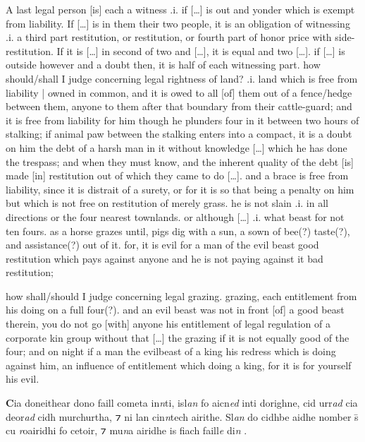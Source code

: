 \documentclass[11pt]{article}
\begin{document}
\begin{pages}
  \begin{Rightside}
    \beginnumbering
   \pstart
   A last legal person [is] each a witness .i. if [\ldots] is out and yonder which is exempt from liability.  If [\ldots] is in them their two people, it is an obligation of witnessing .i. a third part restitution, or restitution, or fourth part of honor price with side-restitution.  If it is [\ldots{}] in second of two and [\ldots{}], it is equal and two [\ldots{}]. if [\ldots{}] is outside however and a doubt then, it is half of each witnessing part.  how should/shall I judge concerning legal rightness of land? .i. land which is free from liability | owned in common, and it is owed to all [of] them out of a fence/hedge between them, anyone to them after that boundary from their cattle-guard; and it is free from liability for him though he plunders four in it between two hours of stalking; if animal paw between the stalking enters into a compact, it is a doubt on him the debt of a harsh man in it without knowledge [\ldots] which he has done the trespass; and when they must know, and the inherent quality of the debt [is] made [in] restitution out of which they came to do [\ldots{}]. and a brace is free from liability, since it is distrait of a surety, or for it is so that being a penalty on him but which is not free on restitution of merely grass.  he is not slain .i. in all directions or the four nearest townlands. or although [\ldots{}] .i. what beast for not ten fours. as a horse grazes until, pigs dig with a sun, a sown of bee(?) taste(?), and assistance(?) out of it. for, it is evil for a man of the evil beast good restitution which pays against anyone and he is not paying against it bad restitution; 
    \pend
  
    \pstart
    how shall/should I judge concerning legal grazing. grazing, each entitlement from his doing on a full four(?). and an evil beast was not in front [of] a good beast therein, you do not go [with] anyone his entitlement of legal regulation of a corporate kin group without that [\ldots{}] the grazing if it is not equally good of the four; and on night if a man the evilbeast of a king his redress which is doing against him, an influence of entitlement which doing a king, for it is for yourself his evil. 
    \pend
    \endnumbering
  \end{Rightside}
  \Pages

  \begin{Leftside}
    \beginnumbering
    \pstart
    \textbf{C}ia doneithear dono faill cometa in\emph{n}ti, isl\emph{an} fo aicn\emph{ed} inti dorighne, cid urr\emph{ad} cia deor\emph{ad} cidh murchurtha, ⁊ ni lan cin\emph{n}tech airithe.  Sl\emph{an} do cidhbe aidhe nomber \={s} cu \emph{r}oairidhi fo cetoir, ⁊ mu\emph{n}a airidhe is fiach faill\emph{e} di\emph{n} .
    \pend


\end{Leftside}
\end{pages}
\end{document}
